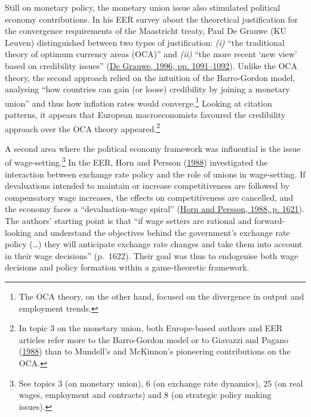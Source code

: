 \documentclass[
  12pt,
  onecolumn]{article}
\begin{document}
Still on monetary policy, the monetary union issue also stimulated political economy contributions. In his EER survey about the theoretical justification for the convergence requirements of the Maastricht treaty, Paul De Grauwe (KU Leuven) distinguished between two types of justification: \emph{(i)} ``the traditional theory of optimum currency areas (OCA)'' and \emph{(ii)} ``the more recent `new view' based on credibility issues'' (\protect\hyperlink{ref-degrauwe1996}{De Grauwe, 1996, pp. 1091--1092}). Unlike the OCA theory, the second approach relied on the intuition of the Barro-Gordon model, analysing ``how countries can gain (or loose) credibility by joining a monetary union'' and thus how inflation rates would converge.\footnote{The OCA theory, on the other hand, focused on the divergence in output and employment trends.} Looking at citation patterns, it appears that European macroeconomists favoured the credibility approach over the OCA theory appeared.\footnote{In topic 3 on the monetary union, both Europe-based authors and EER articles refer more to the Barro-Gordon model or to Giavazzi and Pagano (\protect\hyperlink{ref-giavazzi1988}{1988}) than to Mundell's and McKinnon's pioneering contributions on the OCA.}

A second area where the political economy framework was influential is the issue of wage-setting.\footnote{See topics 3 (on monetary union), 6 (on exchange rate dynamics), 25 (on real wages, employment and contracts) and 8 (on strategic policy making issues).} In the EER, Horn and Persson (\protect\hyperlink{ref-horn1988}{1988}) investigated the interaction between exchange rate policy and the role of unions in wage-setting. If devaluations intended to maintain or increase competitiveness are followed by compensatory wage increases, the effects on competitiveness are cancelled, and the economy faces a ``devaluation-wage spiral'' (\protect\hyperlink{ref-horn1988}{Horn and Persson, 1988, p. 1621}). The authors' starting point is that ``if wage setters are rational and forward-looking and understand the objectives behind the government's exchange rate policy (\ldots) they will anticipate exchange rate changes and take them into account in their wage decisions'' (p.~1622). Their goal was thus to endogenise both wage decisions and policy formation within a game-theoretic framework.
\end{document}
